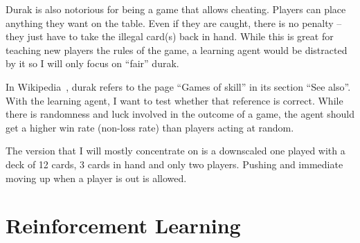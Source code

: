 \documentclass[a4paper,titlepage]{article}
\begin{document}
Durak is also notorious for being a game that allows cheating. Players can place anything they want on the table. Even if they are caught, there is no penalty -- they just have to take the illegal card(s) back in hand. While this is great for teaching new players the rules of the game, a learning agent would be distracted by it so I will only focus on ``fair'' durak.

In Wikipedia~\cite{wikidurak}, durak refers to the page ``Games of skill'' in its section ``See also''. With the learning agent, I want to test whether that reference is correct. While there is randomness and luck involved in the outcome of a game, the agent should get a higher win rate (non-loss rate) than players acting at random. \medskip

The version that I will mostly concentrate on is a downscaled one played with a deck of 12 cards, 3 cards in hand and only two players.
Pushing and immediate moving up when a player is out is allowed.

\newpage

\section{Reinforcement Learning}
\end{document}
